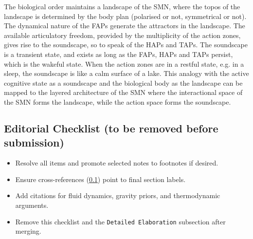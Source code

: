 The biological order maintains a landscape of the SMN, where the topos of the landscape is determined by the body plan (polarised or not, symmetrical or not). The dynamical nature of the FAPs generate the attractors in the landscape. The available articulatory freedom, provided by the multiplicity of the action zones, gives rise to the soundscape, so to speak of the HAPs and TAPs. The soundscape is a transient state, and exists as long as the FAPs, HAPs and TAPs persist, which is the wakeful state. When the action zones are in a restful state, e.g. in a sleep, the soundscape is like a calm surface of a lake. This analogy with the active cognitive state as a soundscape and the biological body as the landscape can be mapped to the layered architecture of the SMN where the interactional space of the SMN forms the landscape, while the action space forms the soundscape.


\subsection{Editorial Checklist (to be removed before submission)}
\begin{itemize}
    \item Resolve all \todo{} items and promote selected \marginpar{} notes to footnotes if desired.
    \item Ensure cross-references (\cref{}) point to final section labels.
    \item Add citations for fluid dynamics, gravity priors, and thermodynamic arguments.
    \item Remove this checklist and the \texttt{Detailed Elaboration} subsection after merging.
\end{itemize}
